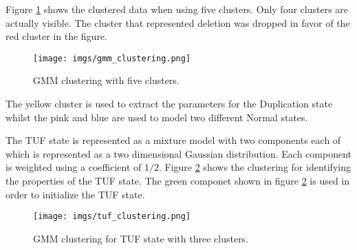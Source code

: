  
Figure \ref{gmm_clustering} shows the clustered data when using five clusters. Only four clusters are actually visible. The cluster that represented deletion was dropped in favor of the  red cluster in the figure.  

\begin{figure}[!htb]
	\begin{center}
		\texttt{[image: imgs/gmm\_clustering.png]}
	\end{center}
	\caption{GMM clustering with five clusters.}
	\label{gmm_clustering}
\end{figure}  

The yellow cluster is used to extract the parameters for the Duplication state whilst the pink and blue are used to model two different Normal states.

The TUF state is represented as a mixture model with two components each of which is represented as a two dimensional Gaussian distribution. Each component is weighted using a coefficient of $1/2$.  Figure \ref{tuf_clustering} shows the clustering for identifying the properties of the TUF state. The green componet shown in figure \ref{tuf_clustering} is used in order to initialize the TUF state.


\begin{figure}[!htb]
	\begin{center}
		\texttt{[image: imgs/tuf\_clustering.png]}
	\end{center}
	\caption{GMM clustering for TUF state with three clusters.}
	\label{tuf_clustering}
\end{figure} 

